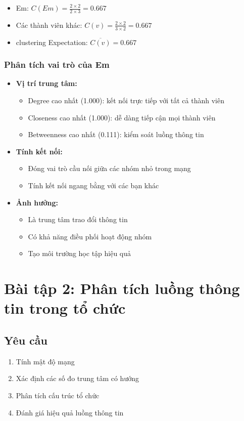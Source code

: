 \documentclass[12pt,a4paper]{article}
\begin{document}
\begin{itemize}
\item Em: $C(Em) = \frac{2 \times 2}{2 \times 3} = 0.667$
\item Các thành viên khác: $C(v) = \frac{2 \times 2}{3 \times 2} = 0.667$
\item clustering Expectation: $\overline{C(v)} = 0.667$
\end{itemize}

\subsubsection{Phân tích vai trò của Em}
\begin{itemize}
\item \textbf{Vị trí trung tâm:}
    \begin{itemize}
    \item Degree cao nhất (1.000): kết nối trực tiếp với tất cả thành viên
    \item Closeness cao nhất (1.000): dễ dàng tiếp cận mọi thành viên
    \item Betweenness cao nhất (0.111): kiểm soát luồng thông tin
    \end{itemize}
\item \textbf{Tính kết nối:}
    \begin{itemize}
    \item Đóng vai trò cầu nối giữa các nhóm nhỏ trong mạng
    \item Tính kết nối ngang bằng với các bạn khác
    \end{itemize}
\item \textbf{Ảnh hưởng:}
    \begin{itemize}
    \item Là trung tâm trao đổi thông tin
    \item Có khả năng điều phối hoạt động nhóm
    \item Tạo môi trường học tập hiệu quả
    \end{itemize}
\end{itemize}

\section{Bài tập 2: Phân tích luồng thông tin trong tổ chức}

\subsection{Yêu cầu}
\begin{enumerate}
\item Tính mật độ mạng
\item Xác định các số đo trung tâm có hướng
\item Phân tích cấu trúc tổ chức
\item Đánh giá hiệu quả luồng thông tin
\end{enumerate}
\end{document}
